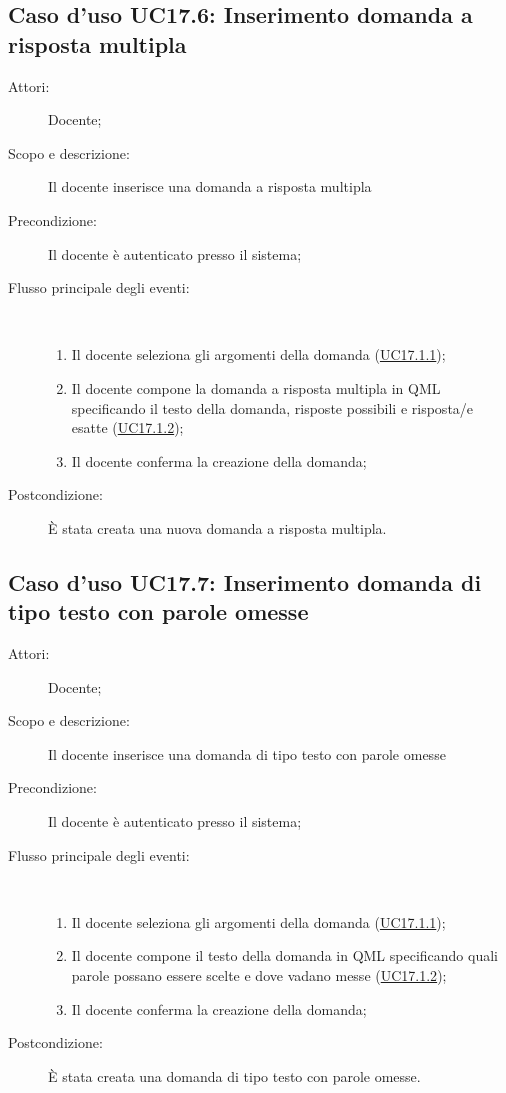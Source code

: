 \subsection{Caso d'uso UC17.6: Inserimento domanda a risposta multipla}\begin{description}
	\item[Attori:] Docente;
	\item[Scopo e descrizione:] Il docente inserisce una domanda a risposta multipla
	\item[Precondizione:] Il docente è autenticato presso il sistema;
	
	\item[Flusso principale degli eventi:] \ 
	\begin{enumerate}
		\item Il docente seleziona gli argomenti della domanda (\hyperlink{UC17.1.1}{UC17.1.1});
		\item Il docente compone la domanda a risposta multipla in QML specificando il testo della domanda, risposte possibili e risposta/e esatte (\hyperlink{UC17.1.2}{UC17.1.2});
		\item Il docente conferma la creazione della domanda;
		
	\end{enumerate}
	\item[Postcondizione:] È stata creata una nuova domanda a risposta multipla.
\end{description}
\hypertarget{UC17.7}{}
\subsection{Caso d'uso UC17.7: Inserimento domanda di tipo testo con parole omesse}\begin{description}
	\item[Attori:] Docente;
	\item[Scopo e descrizione:] Il docente inserisce una domanda di tipo testo con parole omesse
	\item[Precondizione:] Il docente è autenticato presso il sistema;
	
	\item[Flusso principale degli eventi:] \ 
	\begin{enumerate}
		\item Il docente seleziona gli argomenti della domanda (\hyperlink{UC17.1.1}{UC17.1.1});
		\item Il docente compone il testo della domanda in QML specificando quali parole possano essere scelte e dove vadano messe  (\hyperlink{UC17.1.2}{UC17.1.2});
		\item Il docente conferma la creazione della domanda;
		
	\end{enumerate}
	\item[Postcondizione:] È stata creata una domanda di tipo testo con parole omesse.
\end{description}
\hypertarget{UC17.8}{}
